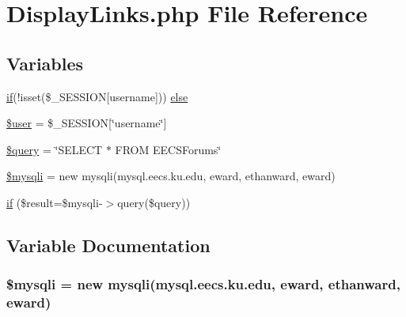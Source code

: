 \hypertarget{_display_links_8php}{}\section{Display\+Links.\+php File Reference}
\label{_display_links_8php}
\subsection*{Variables}
\begin{DoxyCompactItemize}
\item 
\hyperlink{_display_links_8php_aba19ca87a8222f9588fd377feafe258e}{if}(!isset(\$\+\_\+\+S\+E\+S\+S\+I\+ON\mbox{[}\textquotesingle{}username\textquotesingle{}\mbox{]})) \hyperlink{_display_links_8php_a8691f3cba8478e398368302e5f0cb89b}{else}
\item 
\hyperlink{_display_links_8php_a598ca4e71b15a1313ec95f0df1027ca5}{\$user} = \$\+\_\+\+S\+E\+S\+S\+I\+ON\mbox{[}\char`\"{}username\char`\"{}\mbox{]}
\item 
\hyperlink{_display_links_8php_af59a5f7cd609e592c41dc3643efd3c98}{\$query} = \char`\"{}S\+E\+L\+E\+CT $\ast$ F\+R\+OM E\+E\+C\+S\+Forums\char`\"{}
\item 
\hyperlink{_display_links_8php_a580989e8e3521433691a0351287f6315}{\$mysqli} = new mysqli(\textquotesingle{}mysql.\+eecs.\+ku.\+edu\textquotesingle{}, \textquotesingle{}eward\textquotesingle{}, \textquotesingle{}ethanward\textquotesingle{}, \textquotesingle{}eward\textquotesingle{})
\item 
\hyperlink{_display_links_8php_aba19ca87a8222f9588fd377feafe258e}{if} (\$result=\$mysqli-\/$>$query(\$query))
\end{DoxyCompactItemize}


\subsection{Variable Documentation}
\subsubsection[{\texorpdfstring{\$mysqli}{$mysqli}}]{\setlength{\rightskip}{0pt plus 5cm}\$mysqli = new mysqli(\textquotesingle{}mysql.\+eecs.\+ku.\+edu\textquotesingle{}, \textquotesingle{}eward\textquotesingle{}, \textquotesingle{}ethanward\textquotesingle{}, \textquotesingle{}eward\textquotesingle{})}\hypertarget{_display_links_8php_a580989e8e3521433691a0351287f6315}{}\label{_display_links_8php_a580989e8e3521433691a0351287f6315}
